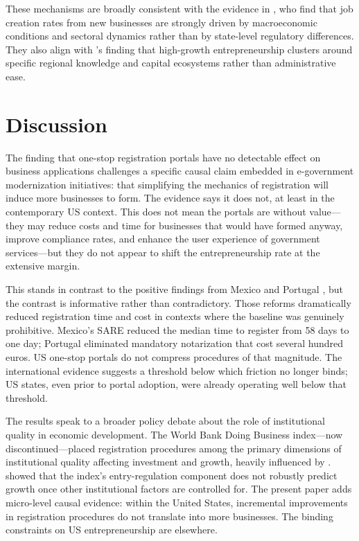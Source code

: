 \documentclass[12pt]{article}
\begin{document}
These mechanisms are broadly consistent with the evidence in \citet{haltiwanger2013}, who find that job creation rates from new businesses are strongly driven by macroeconomic conditions and sectoral dynamics rather than by state-level regulatory differences. They also align with \citet{guzman2016}'s finding that high-growth entrepreneurship clusters around specific regional knowledge and capital ecosystems rather than administrative ease.

\section{Discussion}

The finding that one-stop registration portals have no detectable effect on business applications challenges a specific causal claim embedded in e-government modernization initiatives: that simplifying the mechanics of registration will induce more businesses to form. The evidence says it does not, at least in the contemporary US context. This does not mean the portals are without value---they may reduce costs and time for businesses that would have formed anyway, improve compliance rates, and enhance the user experience of government services---but they do not appear to shift the entrepreneurship rate at the extensive margin.

This stands in contrast to the positive findings from Mexico \citep{bruhn2011} and Portugal \citep{branstetter2014}, but the contrast is informative rather than contradictory. Those reforms dramatically reduced registration time and cost in contexts where the baseline was genuinely prohibitive. Mexico's SARE reduced the median time to register from 58 days to one day; Portugal eliminated mandatory notarization that cost several hundred euros. US one-stop portals do not compress procedures of that magnitude. The international evidence suggests a threshold below which friction no longer binds; US states, even prior to portal adoption, were already operating well below that threshold.

The results speak to a broader policy debate about the role of institutional quality in economic development. The World Bank Doing Business index---now discontinued---placed registration procedures among the primary dimensions of institutional quality affecting investment and growth, heavily influenced by \citet{djankov2002regulation}. \citet{ciccone2013} showed that the index's entry-regulation component does not robustly predict growth once other institutional factors are controlled for. The present paper adds micro-level causal evidence: within the United States, incremental improvements in registration procedures do not translate into more businesses. The binding constraints on US entrepreneurship are elsewhere.
\end{document}

